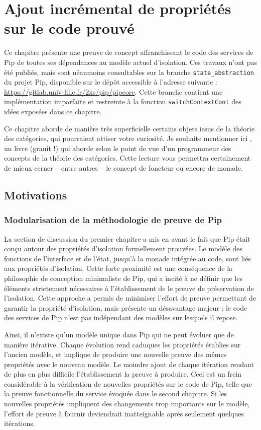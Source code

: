 \chapter{Ajout incrémental de propriétés sur le code prouvé}

	Ce chapitre présente une preuve de concept affranchissant le code des services de Pip de toutes ses dépendances au modèle actuel d'isolation. Ces travaux n'ont pas été publiés, mais sont néanmoins consultables sur la branche \texttt{state\_abstraction} du projet Pip, disponible sur le dépôt accessible à l'adresse suivante : \url{https://gitlab.univ-lille.fr/2xs/pip/pipcore}. Cette branche contient une implémentation imparfaite et restreinte à la fonction \texttt{switchContextCont} des idées exposées dans ce chapitre.

	Ce chapitre aborde de manière très superficielle certains objets issus de la théorie des catégories, qui pourraient attiser votre curiosité. Je souhaite mentionner ici \cite{categorytheoryforprogrammers}, un livre (grauit !) qui aborde selon le point de vue d'un programmeur des concepts de la théorie des catégories. Cette lecture vous permettra certainement de mieux cerner -- entre autres -- le concept de foncteur ou encore de monade.

	\section{Motivations}
		\subsection{Modularisation de la méthodologie de preuve de Pip}
	La section de discussion du premier chapitre a mis en avant le fait que Pip était conçu autour des propriétés d'isolation formellement prouvées. Le modèle des fonctions de l'interface et de l'état, jusqu'à la monade intégrée au code, sont liés aux propriétés d'isolation. Cette forte proximité est une conséquence de la philosophie de conception minimaliste de Pip, qui a incité à ne définir que les éléments strictement nécessaires à l'établissement de le preuve de préservation de l'isolation. Cette approche a permis de minimiser l'effort de preuve permettant de garantir la propriété d'isolation, mais présente un désavantage majeur : le code des services de Pip n'est pas indépendant des modèles sur lesquels il repose.

	Ainsi, il n'existe qu'un modèle unique dans Pip qui ne peut évoluer que de manière itérative. Chaque évolution rend caduques les propriétés établies sur l'ancien modèle, et implique de produire une nouvelle preuve des mêmes propriétés avec le nouveau modèle. Le moindre ajout de chaque itération rendant de plus en plus difficile l'établissement la preuve à produire.
	Ceci est un frein considérable à la vérification de nouvelles propriétés sur le code de Pip, telle que la preuve fonctionnelle du service évoquée dans le second chapitre. Si les nouvelles propriétés impliquent des changements trop importants sur le modèle, l'effort de preuve à fournir deviendrait inatteignable après seulement quelques itérations.

